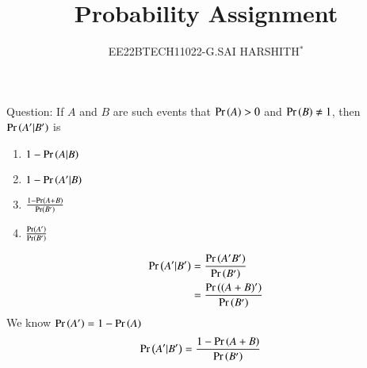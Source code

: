 \documentclass[journal,12pt,twocolumn]{IEEEtran}
\theoremstyle{remark}
\begin{document}

\vspace{3cm}

\title{Probability Assignment}
\author{EE22BTECH11022-G.SAI HARSHITH$^{*}$%
}
\maketitle
\newpage
\bigskip
\renewcommand{\thefigure}{\theenumi}
\renewcommand{\thetable}{\theenumi}

Question: If $A$ and $B$ are such events that $\Pr\left(A\right) > 0$ and $\Pr\left(B\right)\neq 1$, then $\Pr\left(A^\prime|B^\prime\right)$ is
\begin{enumerate}
\item $1-\Pr\left(A|B\right)$
\item $1-\Pr\left(A^\prime|B\right)$
\item $\frac{1-\Pr\left(A+B\right)}{\Pr\left(B^\prime\right)}$
\item $\frac{\Pr\left(A^\prime\right)}{\Pr\left(B^\prime\right)}$
\end{enumerate}
\solution
\begin{align}
\Pr\left(A^\prime|B^\prime\right)&=\frac{\Pr\left(A^\prime B^\prime\right)}{\Pr\left(B^\prime\right)}\\
&=\frac{\Pr\left((A+B)^\prime\right)}{\Pr\left(B^\prime\right)}
\end{align}
We know $\Pr\left(A^\prime\right)=1-\Pr\left(A\right)$
\begin{align}
\Pr\left(A^\prime|B^\prime\right)&=\frac{1-\Pr\left(A+B\right)}{\Pr\left(B^\prime\right)}
\end{align}
\end{document}
